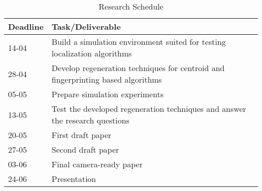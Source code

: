 \documentclass{sig-alternate-br}
\begin{document}
\begin{table}
\centering \caption{Research Schedule}
\begin{tabular}{|l|p{6cm}|} \hline
\textbf{Deadline} & \textbf{Task/Deliverable}\\ \hline
14-04&Build a simulation environment suited for testing localization algorithms\\ \hline
28-04&Develop regeneration techniques for centroid and fingerprinting based algorithms\\ \hline
05-05&Prepare simulation experiments\\ \hline 
13-05&Test the developed regeneration techniques and answer the research questions\\ \hline
20-05&First draft paper\\ \hline 
27-05&Second draft paper\\ \hline 
03-06&Final camera-ready paper\\ \hline
24-06&Presentation\\ \hline
\end{tabular}
\end{table}


\vspace{40 mm}


%
%



\balancecolumns
\end{document}

